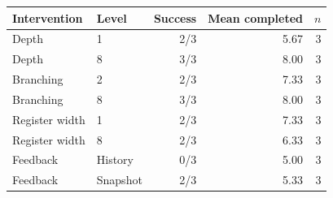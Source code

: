 \begin{tabular}{llrrr}
\toprule
Intervention & Level & Success & Mean completed & $n$ \\
\midrule
Depth & 1 & 2/3 & 5.67 & 3 \\
Depth & 8 & 3/3 & 8.00 & 3 \\
Branching & 2 & 2/3 & 7.33 & 3 \\
Branching & 8 & 3/3 & 8.00 & 3 \\
Register width & 1 & 2/3 & 7.33 & 3 \\
Register width & 8 & 2/3 & 6.33 & 3 \\
Feedback & History & 0/3 & 5.00 & 3 \\
Feedback & Snapshot & 2/3 & 5.33 & 3 \\
\bottomrule
\end{tabular}
